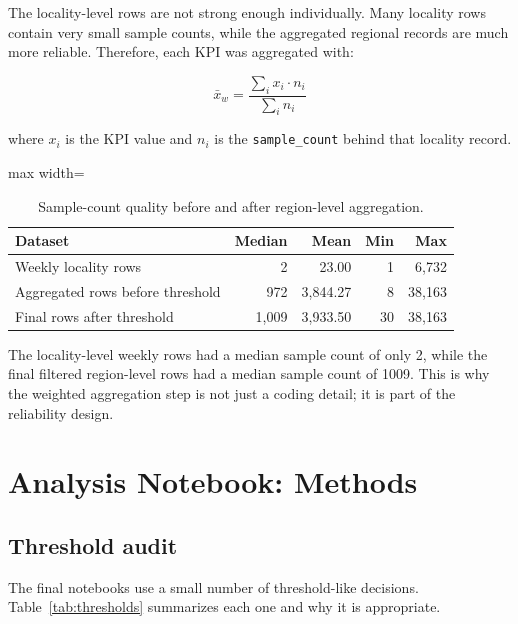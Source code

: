 \documentclass[12pt,a4paper]{article}
\begin{document}
The locality-level rows are not strong enough individually. Many locality rows contain very small sample counts, while the aggregated regional records are much more reliable. Therefore, each KPI was aggregated with:

\[
\bar{x}_w = \frac{\sum_i x_i \cdot n_i}{\sum_i n_i}
\]

where \(x_i\) is the KPI value and \(n_i\) is the \texttt{sample\_count} behind that locality record.

\begin{table}[htbp]
\centering
\begin{adjustbox}{max width=\textwidth}
\begin{tabular}{lrrrr}
\toprule
Dataset & Median & Mean & Min & Max \\
\midrule
Weekly locality rows & 2 & 23.00 & 1 & 6,732 \\
Aggregated rows before threshold & 972 & 3,844.27 & 8 & 38,163 \\
Final rows after threshold & 1,009 & 3,933.50 & 30 & 38,163 \\
\bottomrule
\end{tabular}
\end{adjustbox}
\caption{Sample-count quality before and after region-level aggregation.}
\label{tab:sample}
\end{table}

The locality-level weekly rows had a median sample count of only 2, while the final filtered region-level rows had a median sample count of \num{1009}. This is why the weighted aggregation step is not just a coding detail; it is part of the reliability design.

\section{Analysis Notebook: Methods}

\subsection{Threshold audit}

The final notebooks use a small number of threshold-like decisions. Table~\ref{tab:thresholds} summarizes each one and why it is appropriate.
\end{document}
